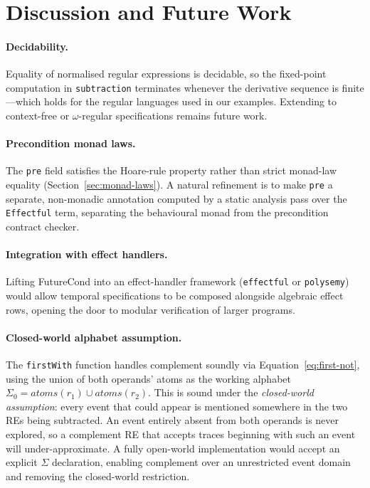 \documentclass[acmsmall,screen]{acmart}
\begin{document}
\section{Discussion and Future Work}
\label{sec:discussion}

\paragraph{Decidability.}
Equality of normalised regular expressions is decidable, so the
fixed-point computation in \lstinline{subtraction} terminates whenever
the derivative sequence is finite---which holds for the regular
languages used in our examples. Extending to context-free or
$\omega$-regular specifications remains future work.

\paragraph{Precondition monad laws.}
The \lstinline{pre} field satisfies the Hoare-rule property
rather than strict monad-law equality (Section~\ref{sec:monad-laws}).
A natural refinement is to make \lstinline{pre} a separate, non-monadic
annotation computed by a static analysis pass over the \lstinline{Effectful}
term, separating the behavioural monad from the precondition contract checker.

\paragraph{Integration with effect handlers.}
Lifting FutureCond into an effect-handler framework
(\texttt{effectful} or \texttt{polysemy}) would allow temporal
specifications to be composed alongside algebraic effect rows, opening
the door to modular verification of larger programs.

\paragraph{Closed-world alphabet assumption.}
The \lstinline{firstWith} function handles complement soundly via
Equation~\eqref{eq:first-not}, using the union of both operands' atoms as the
working alphabet $\Sigma_0 = \mathit{atoms}(r_1)\cup\mathit{atoms}(r_2)$.
This is sound under the \emph{closed-world assumption}: every event that
could appear is mentioned somewhere in the two REs being subtracted.
An event entirely absent from both operands is never explored, so
a complement RE that accepts traces beginning with such an event
will under-approximate.
A fully open-world implementation would accept an explicit $\Sigma$
declaration, enabling complement over an unrestricted event domain
and removing the closed-world restriction.
\end{document}
